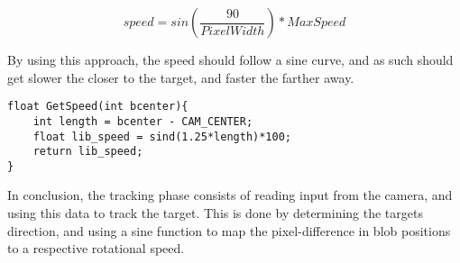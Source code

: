 \begin{equation}\label{sineF}
speed = sin(\frac{90}{PixelWidth})*MaxSpeed
\end{equation} 

By using this approach, the speed should follow a sine curve, and as such
should get slower the closer to the target, and faster the farther away.\nl

\begin{minipage}[H]{\linewidth}
\begin{lstlisting}[caption = Determine speed to rotate using a sine function, label = GetZeSpeed] 
float GetSpeed(int bcenter){
    int length = bcenter - CAM_CENTER;
    float lib_speed = sind(1.25*length)*100;
    return lib_speed;
}
\end{lstlisting}
\end{minipage}

In conclusion, the tracking phase consists of reading input from the camera, and
using this data to track the target. This is done by determining the targets
direction, and using a sine function to map the pixel-difference in blob
positions to a respective rotational speed.